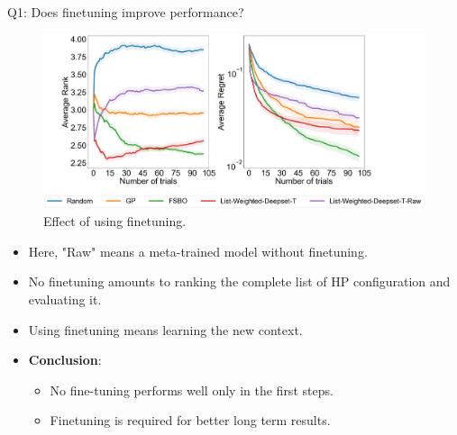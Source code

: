 \documentclass{beamer}
\begin{document}
\begin{frame}[t]{Q1: Does finetuning improve performance?}

\begin{figure}[h]
  \centering
    \includegraphics[scale=0.12]{images/FineTuningAblation}
    \caption{Effect of using finetuning.}
    \label{fig:FineTuningAblation}
\end{figure}

\begin{itemize}
\item Here,  "Raw" means a meta-trained model without finetuning.
\item No finetuning amounts to ranking the complete list of HP configuration and evaluating it.
\item Using finetuning means learning the new context.
\item \textbf{Conclusion}:
\begin{itemize}
\item No fine-tuning performs well only in the first steps.
\item Finetuning is required for better long term results.
\end{itemize}
\end{itemize}

\end{frame}
\end{document}

